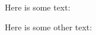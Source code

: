 \documentclass{article}
\begin{document}
Here is some text:

\exampleN


Here is some other text:

\exampleTwoN


\end{document}
